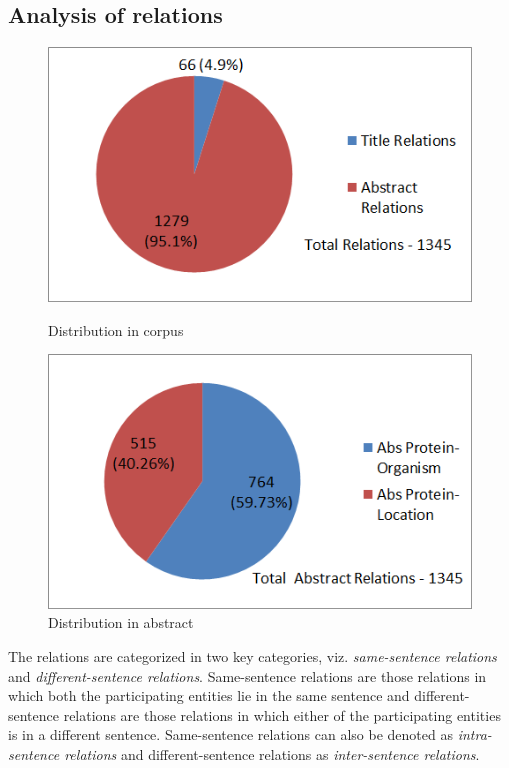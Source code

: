 \subsection*{Analysis of relations}

\begin{figure}
\centering
\begin{minipage}{.5\textwidth}
  \centering
  \includegraphics[width=.95\textwidth]{figures/Rel_Title_Abs_Distribution.png}
  \caption{Distribution in corpus}
  \label{fig:Rel_Title_Abs}
\end{minipage}%
\begin{minipage}{.5\textwidth}
  \centering
  \includegraphics[width=.95\textwidth]{figures/AbsRel_PO_PL_Distribution.png}
  \caption{Distribution in abstract}
  \label{fig:Rel_Abs_PO_PL}
\end{minipage}
\end{figure}

The relations are categorized in two key categories, viz. \emph{same-sentence relations} and \emph{different-sentence relations}. Same-sentence relations are those relations in which both the participating entities lie in the same sentence and different-sentence relations are those relations in which either of the participating entities is in a different sentence. Same-sentence relations can also be denoted as \emph{intra-sentence relations} and different-sentence relations as \emph{inter-sentence relations}.

